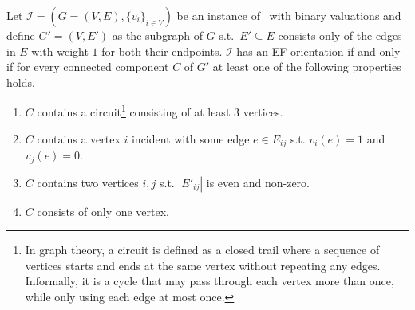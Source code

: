 \documentclass[11pt,letterpaper]{article}
\begin{document}
\begin{theoremrep}\label{theorem:connected_component_props}
    Let $\mathcal{I}=(G=(V,E),\{v_i\}_{i\in V})$ be an instance of \EFo\ with binary valuations and define $G'=(V,E')$ as the subgraph of $G$ s.t.~$E'\subseteq E$ consists only of the edges in $E$ with weight $1$ for both their endpoints. $\mathcal{I}$ has an EF orientation if and only if for every connected component $C$ of $G'$ at least one of the following properties holds.
    \begin{enumerate}
        \item $C$ contains a circuit\footnote{In graph theory, a circuit is defined as a closed trail where a sequence of vertices starts and ends at the same vertex without repeating any edges. Informally, it is a cycle that may pass through each vertex more than once, while only using each edge at most once.} consisting of at least $3$ vertices.\label{prop1}
        \item $C$ contains a vertex $i$ incident with some edge $e\in E_{ij}$ s.t. $v_i(e)=1$ and $v_j(e)=0$.\label{prop2}
        \item $C$ contains two vertices $i,j$ s.t. $|E'_{ij}|$ is even and non-zero.\label{prop3}
        \item $C$ consists of only one vertex.\label{prop4}
    \end{enumerate}
\end{theoremrep}
\end{document}

